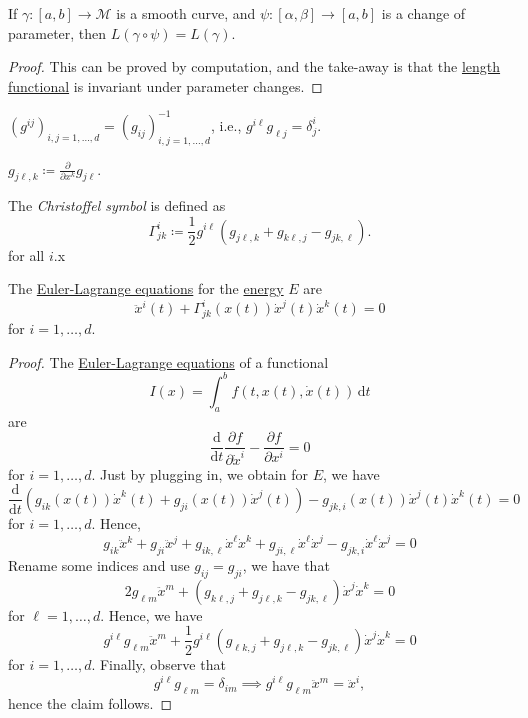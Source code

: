 \begin{lemma}
	If \(\gamma\colon [a, b] \to  \mathcal{M} \) is a smooth curve, and \(\psi \colon [\alpha , \beta ] \to  [a, b]\) is a change of parameter, then \(L(\gamma \circ \psi ) = L(\gamma )\).
\end{lemma}
\begin{proof}
	This can be proved by computation, and the take-away is that the \hyperref[def:length]{length functional} is invariant under parameter changes.
\end{proof}

\begin{notation}
	\(\left( g^{ij} \right) _{i, j=1, \ldots , d} = \left( g_{ij} \right)_{i, j = 1, \ldots , d} ^{-1} \), i.e., \(g^{i \ell} g_{\ell j}=\delta ^i_j \).
\end{notation}

\begin{notation}
	\(g_{j \ell , k} \coloneqq \frac{\partial }{\partial x^k} g_{j \ell }\).
\end{notation}

\begin{definition}\label{def:Christoffel-symbol}
	The \emph{Christoffel symbol} is defined as
	\[
		\Gamma ^i_{jk} \coloneqq \frac{1}{2}g^{i \ell }\left( g_{j \ell , k} + g_{k \ell , j} - g_{jk, \ell }\right) .
	\]
	for all \(i\).x
\end{definition}

\begin{proposition}
	The \href{https://en.wikipedia.org/wiki/Euler%E2%80%93Lagrange_equation}{Euler-Lagrange equations} for the \hyperref[def:energy]{energy} \(E\) are 
	\[
		\ddot{x}^i(t) + \Gamma ^{i}_{jk}(x(t)) \dot{x}^j(t)\dot{x}^k(t) = 0
	\]
	for \(i = 1, \ldots , d\).
\end{proposition}
\begin{proof}
	The \href{https://en.wikipedia.org/wiki/Euler%E2%80%93Lagrange_equation}{Euler-Lagrange equations} of a functional 
	\[
		I(x) = \int_{a}^{b} f(t, x(t), \dot{x}(t)) \,\mathrm{d}t
	\]
	are
	\[
		\frac{\mathrm{d}}{\mathrm{d}t} \frac{\partial f}{\partial \dot{x}^i} - \frac{\partial f}{\partial x^i} = 0
	\]
	for \(i = 1, \ldots , d\). Just by plugging in, we obtain for \(E\), we have
	\[
		\frac{\mathrm{d}}{\mathrm{d}t} \left( g_{ik} (x(t)) \dot{x}^k (t) + g_{ji}(x(t))\dot{x}^j(t) \right) - g_{jk, i}(x(t))\dot{x}^j(t)\dot{x}^k(t) = 0
	\]
	for \(i = 1, \ldots , d\). Hence,
	\[
		g_{ik} \ddot{x}^k + g_{ji}\ddot{x}^j + g_{ik, \ell }\dot{x}^{\ell }\dot{x}^k + g_{ji, \ell }\dot{x}^{\ell}\dot{x}^j - g_{jk, i} \dot{x}^{\ell } \dot{x}^j = 0
	\]
	Rename some indices and use \(g_{ij} = g_{ji} \), we have that
	\[
		2g_{\ell m}\ddot{x}^m + \left( g_{k \ell , j}+ g_{j \ell , k} - g_{jk, \ell} \right) \dot{x}^j \dot{x}^k = 0
	\]
	for \(\ell = 1, \ldots , d\). Hence, we have
	\[
		g^{i \ell }g_{\ell m}\ddot{x}^m + \frac{1}{2} g^{i \ell } \left( g_{\ell k, j} + g_{j \ell , k} - g_{jk, \ell } \right) \dot{x}^j \dot{x}^k = 0
	\]
	for \(i = 1, \ldots , d\). Finally, observe that
	\[
		g^{i \ell } g_{\ell m} = \delta _{im}
		\implies g^{i \ell } g_{\ell m} \ddot{x}^m = \ddot{x}^i,
	\]
	hence the claim follows.
\end{proof}

